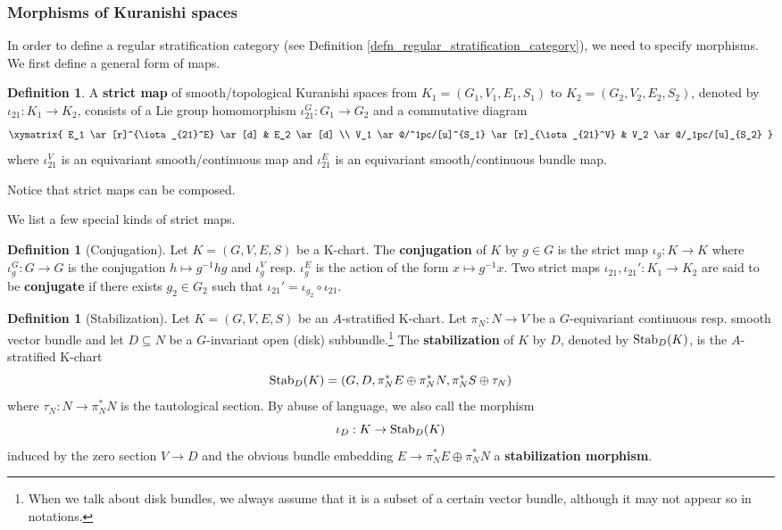 \documentclass[reqno, 10pt]{amsart}
\numberwithin{equation}{section}
\numberwithin{equation}{section}
\renewcommand{\subset}{\subseteq}
\theoremstyle{definition}
\newtheorem{defn}[thm]{Definition}
\theoremstyle{remark}
\newcommand{\beqn}{\begin{equation*}}
\newcommand{\eeqn}{\end{equation*}}
\begin{document}
\subsubsection{Morphisms of Kuranishi spaces}

In order to define a regular stratification category (see Definition \ref{defn_regular_stratification_category}), we need to specify morphisms. We first define a general form of maps.

\begin{defn}
A {\bf strict map} of smooth/topological Kuranishi spaces from $K_1 = (G_1, V_1, E_1, S_1)$ to $K_2 = (G_2, V_2, E_2, S_2)$, denoted by $\iota_{21}: K_1 \to K_2$, consists of a Lie group homomorphism $\iota_{21}^G: G_1 \to G_2$ and a commutative diagram
\beqn
\xymatrix{   E_1 \ar[r]^{\iota_{21}^E} \ar[d]  &  E_2 \ar[d] \\
    V_1 \ar@/^1pc/[u]^{S_1} \ar[r]_{\iota_{21}^V} & V_2 \ar@/_1pc/[u]_{S_2} }
\eeqn
where $\iota_{21}^V$ is an equivariant smooth/continuous map and $\iota_{21}^E$ is an equivariant smooth/continuous bundle map.
\end{defn}

Notice that strict maps can be composed.

We list a few special kinds of strict maps.

\begin{defn}[Conjugation] \label{K_chart_conjugation} 
Let $K = (G, V, E, S)$ be a K-chart. The {\bf conjugation} of $K$ by $g \in G$ is the strict map $\iota_g: K \to K$ where $\iota_g^G: G \to G$ is the conjugation $h \mapsto g^{-1} h g$ and $\iota_g^V$ resp. $\iota_g^E$ is the action of the form $x \mapsto g^{-1} x$. Two strict maps $\iota_{21}, \iota_{21}': K_1 \to K_2$ are said to be {\bf conjugate} if there exists $g_2 \in G_2$ such that $\iota_{21}' = \iota_{g_2} \circ \iota_{21}$.
\end{defn}

\begin{defn}[Stabilization]
Let $K = (G, V, E, S)$ be an $A$-stratified K-chart. Let $\pi_N: N \to V$ be a $G$-equivariant continuous resp. smooth vector bundle and let $D \subset N$ be a $G$-invariant open (disk) subbundle.\footnote{When we talk about disk bundles, we always assume that it is a subset of a certain vector bundle, although it may not appear so in notations.} The {\bf stabilization} of $K$ by $D$, denoted by ${\rm Stab}_D (K)$, is the $A$-stratified K-chart 
\beqn
{\rm Stab}_D (K) = (G, D, \pi_N^* E \oplus \pi_N^* N, \pi_N^* S \oplus \tau_N)
\eeqn
where $\tau_N: N \to \pi_N^* N$ is the tautological section. By abuse of language, we also call the morphism
\beqn
\iota_D: K \to {\rm Stab}_D (K)
\eeqn
induced by the zero section $V \to D$ and the obvious bundle embedding $E \to \pi_N^* E \oplus \pi_N^* N$ a {\bf stabilization morphism}.
\end{defn}
\end{document}
